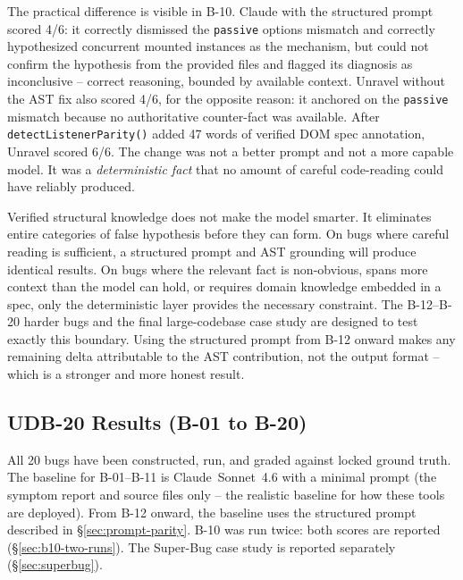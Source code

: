 \documentclass[12pt,a4paper]{article}
\newcommand{\code}[1]{\texttt{\small #1}}
\begin{document}
The practical difference is visible in B-10. Claude with the structured prompt scored
4/6: it correctly dismissed the \code{passive} options mismatch and correctly
hypothesized concurrent mounted instances as the mechanism, but could not confirm the
hypothesis from the provided files and flagged its diagnosis as inconclusive -- correct
reasoning, bounded by available context. Unravel without the AST fix also scored 4/6,
for the opposite reason: it anchored on the \code{passive} mismatch because no
authoritative counter-fact was available. After \code{detectListenerParity()} added
47 words of verified DOM spec annotation, Unravel scored 6/6. The change was not a
better prompt and not a more capable model. It was a \textit{deterministic fact} that
no amount of careful code-reading could have reliably produced.

Verified structural knowledge does not make the model smarter. It eliminates entire
categories of false hypothesis before they can form. On bugs where careful reading is
sufficient, a structured prompt and AST grounding will produce identical results. On
bugs where the relevant fact is non-obvious, spans more context than the model can hold,
or requires domain knowledge embedded in a spec, only the deterministic layer provides
the necessary constraint. The B-12--B-20 harder bugs and the final large-codebase case
study are designed to test exactly this boundary. Using the structured prompt from B-12
onward makes any remaining delta attributable to the AST contribution, not the output
format -- which is a stronger and more honest result.


\subsection{UDB-20 Results (B-01 to B-20)}
\label{sec:udb20-results}

All 20 bugs have been constructed, run, and graded against locked ground truth.
The baseline for B-01--B-11 is Claude~Sonnet~4.6 with a minimal prompt (the
symptom report and source files only -- the realistic baseline for how these tools
are deployed). From B-12 onward, the baseline uses the structured prompt described
in \S\ref{sec:prompt-parity}. B-10 was run twice: both scores are reported
(\S\ref{sec:b10-two-runs}). The Super-Bug case study is reported separately
(\S\ref{sec:superbug}).
\end{document}
